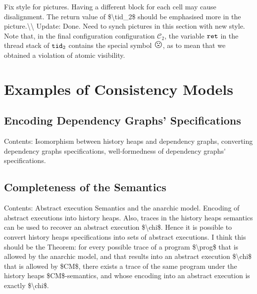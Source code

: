 \documentclass[a4paper,UKenglish]{article}%
\theoremstyle{plain}
\begin{document}
\begin{center}
\end{center}

\ac{Fix style for pictures. Having a different block for each cell may cause disalignment.
The return value of $\tid_2$ should be emphasised more in the picture.\\
Update: Done. Need to synch pictures in this section with new style.}
Note that, in the final configuration configuration $\mathcal{C}_2$, the variable $\texttt{ret}$ in the thread 
stack of $\tid_2$ contains the special symbol $\Large \frownie{}$, as to mean that we obtained a violation of 
atomic visibility.

\section{Examples of Consistency Models}



\subsection{Encoding Dependency Graphs' Specifications}
\ac{Contents: Isomorphism between history heaps and dependency graphs, 
converting dependency graphs specifications, well-formedness of dependency graphs' specifications.}

\subsection{Completeness of the Semantics} 
\ac{Contents: Abstract execution Semantics and the anarchic model. 
Encoding of abstract executions into history heaps. Also, 
traces in the history heaps semantics can be used to recover 
an abstract execution $\chi$. Hence it is possible to convert history heaps 
specifications into sets of abstract executions.
I think this should be the Theorem: for every possible trace of a program $\prog$ that is allowed by the anarchic 
model, and that results into an abstract execution $\chi$ that is allowed by $CM$, there 
exists a trace of the same program under the history heaps $CM$-semantics, 
and whose encoding into an abstract execution is exactly $\chi$.}
\end{document}
